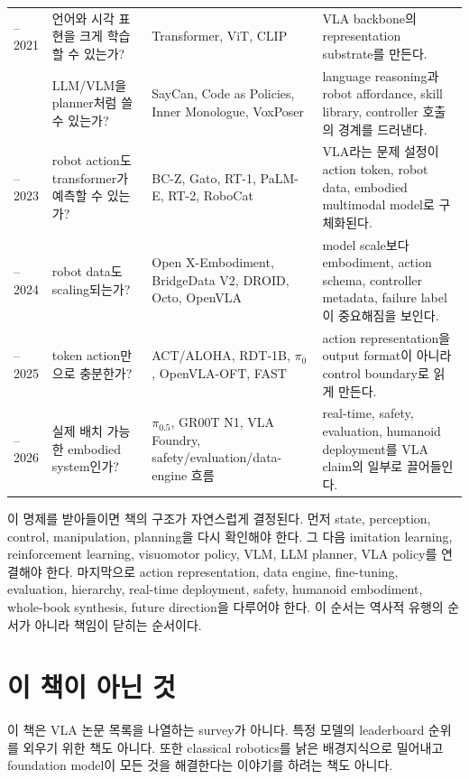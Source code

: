 {\begin{longtable}{@{}>{\RaggedRight\arraybackslash}p{19mm}>{\RaggedRight\arraybackslash}p{29mm}>{\RaggedRight\arraybackslash}p{35mm}>{\RaggedRight\arraybackslash}p{43mm}@{}}
2017--2021 & 언어와 시각 표현을 크게 학습할 수 있는가? & Transformer, ViT, CLIP \cite{vaswani2017,dosovitskiy2021vit,clip2021} & VLA backbone의 representation substrate를 만든다. \\
2022 & LLM/VLM을 planner처럼 쓸 수 있는가? & SayCan, Code as Policies, Inner Monologue, VoxPoser \cite{saycan2022,codeaspolicies2022,innermonologue2022,voxposer2023} & language reasoning과 robot affordance, skill library, controller 호출의 경계를 드러낸다. \\
2022--2023 & robot action도 transformer가 예측할 수 있는가? & BC-Z, Gato, RT-1, PaLM-E, RT-2, RoboCat \cite{bcz2022,gato2022,rt12022,palme2023,rt22023,robocat2023} & VLA라는 문제 설정이 action token, robot data, embodied multimodal model로 구체화된다. \\
2023--2024 & robot data도 scaling되는가? & Open X-Embodiment, BridgeData V2, DROID, Octo, OpenVLA \cite{openx2023,bridgedatav22023,droid2024,octo2024,openvla2024} & model scale보다 embodiment, action schema, controller metadata, failure label이 중요해짐을 보인다. \\
2024--2025 & token action만으로 충분한가? & ACT/ALOHA, RDT-1B, $\pi_0$, OpenVLA-OFT, FAST \cite{act2023,rdt1b2024,pi02024,openvlaoft2025,fast2025} & action representation을 output format이 아니라 control boundary로 읽게 만든다. \\
2025--2026 & 실제 배치 가능한 embodied system인가? & $\pi_{0.5}$, GR00T N1, VLA Foundry, safety/evaluation/data-engine 흐름 \cite{pi052025,grootn12025,vlafoundry2026,libero2023,simplerenv2024} & real-time, safety, evaluation, humanoid deployment를 VLA claim의 일부로 끌어들인다. \\
\end{longtable}
}

이 명제를 받아들이면 책의 구조가 자연스럽게 결정된다. 먼저 state, perception, control, manipulation, planning을 다시 확인해야 한다. 그 다음 imitation learning, reinforcement learning, visuomotor policy, VLM, LLM planner, VLA policy를 연결해야 한다. 마지막으로 action representation, data engine, fine-tuning, evaluation, hierarchy, real-time deployment, safety, humanoid embodiment, whole-book synthesis, future direction을 다루어야 한다. 이 순서는 역사적 유행의 순서가 아니라 책임이 닫히는 순서이다.

\section{이 책이 아닌 것}

이 책은 VLA 논문 목록을 나열하는 survey가 아니다. 특정 모델의 leaderboard 순위를 외우기 위한 책도 아니다. 또한 classical robotics를 낡은 배경지식으로 밀어내고 foundation model이 모든 것을 해결한다는 이야기를 하려는 책도 아니다.


